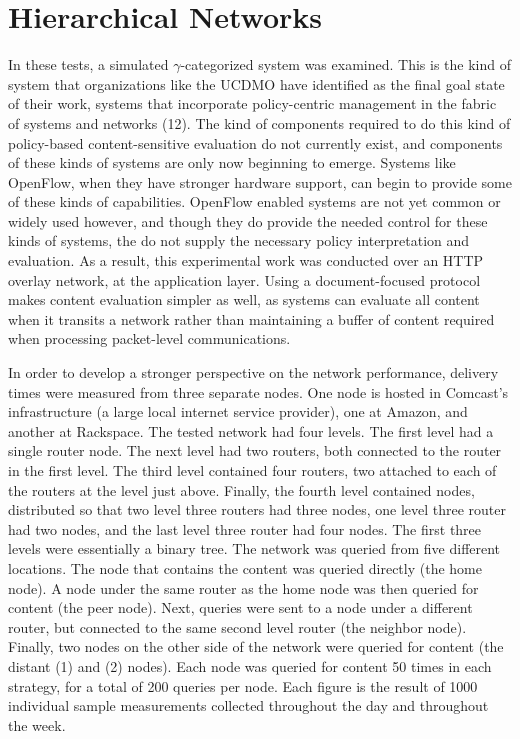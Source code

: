\section{Hierarchical Networks}
In these tests, a simulated $\gamma$-categorized system was examined.  This is the kind of system that organizations like the UCDMO have identified as the final goal state of their work, systems that incorporate policy-centric management in the fabric of systems and networks (12).  The kind of components required to do this kind of policy-based content-sensitive evaluation do not currently exist, and components of these kinds of systems are only now beginning to emerge.  Systems like OpenFlow, when they have stronger hardware support, can begin to provide some of these kinds of capabilities.  OpenFlow enabled systems are not yet common or widely used however, and though they do provide the needed control for these kinds of systems, the do not supply the necessary policy interpretation and evaluation.  As a result, this experimental work was conducted over an HTTP overlay network, at the application layer.  Using a document-focused protocol makes content evaluation simpler as well, as systems can evaluate all content when it transits a network rather than maintaining a buffer of content required when processing packet-level communications.

In order to develop a stronger perspective on the network performance, delivery times were measured from three separate nodes.   One node is hosted in Comcast's infrastructure (a large local internet service provider), one at Amazon, and another at Rackspace.  The tested network had four levels.  The first level had a single router node.  The next level had two routers, both connected to the router in the first level.  The third level contained four routers, two attached to each of the routers at the level just above.  Finally, the fourth level contained nodes, distributed so that two level three routers had three nodes, one level three router had two nodes, and the last level three router had four nodes.  The first three levels were essentially a binary tree.  The network was queried from five different locations.  The node that contains the content was queried directly (the home node).  A node under the same router as the home node was then queried for content (the peer node).  Next, queries were sent to a node under a different router, but connected to the same second level router (the neighbor node).  Finally, two nodes on the other side of the network were queried for content (the distant (1) and (2) nodes).  Each node was queried for content 50 times in each strategy, for a total of 200 queries per node.  Each figure is the result of 1000 individual sample measurements collected throughout the day and throughout the week.

